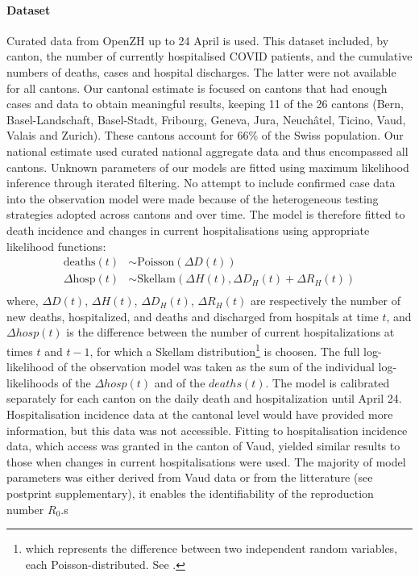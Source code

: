 \paragraph{Dataset} Curated data from OpenZH\cite[3\baselineskip]{openZH:OpenZHCovid19:2020} up to 24 April is used. This dataset included, by canton, the number of currently hospitalised COVID patients, and the cumulative numbers of deaths, cases and hospital discharges. The latter were not available for all cantons. Our cantonal estimate is focused on cantons that had enough cases and data to obtain meaningful results, keeping 11 of the 26 cantons (Bern, Basel-Landschaft, Basel-Stadt, Fribourg, Geneva, Jura, Neuchâtel, Ticino, Vaud, Valais and Zurich). These cantons account for 66\% of the Swiss population. Our national estimate used curated national aggregate data and thus encompassed all cantons\cite{Probst:DaenuprobstCovid19casesswitzerland:2020}. Unknown parameters of our models are fitted using maximum likelihood inference through iterated filtering\cite{Ionides:InferenceDynamicLatent:2015}. No attempt to include confirmed case data into the observation model were made because of the heterogeneous testing strategies adopted across cantons and over time. The model is therefore fitted to death incidence and changes in current hospitalisations using appropriate likelihood functions:
\begin{equation}
\begin{split}
 \text{deaths}(t) &\sim \text{Poisson}(\Delta D(t)) \\
\Delta  \text{hosp}(t) &\sim \text{Skellam}(\Delta H(t), \Delta D_H(t) + \Delta R_H(t)) \\
\end{split}
\end{equation}
\noindent where, $\Delta D(t)$, $\Delta H(t)$, $\Delta D_H(t)$, $\Delta R_H(t)$ are respectively the number of new deaths, hospitalized, and deaths and discharged from hospitals at time $t$, and $\Delta hosp(t)$ is the difference between the number of current hospitalizations at times $t$ and $t-1$, for which a Skellam distribution\footnote{which represents the difference between two independent random variables, each Poisson-distributed. See .} is choosen. The full log-likelihood of the observation model was taken as the sum of the individual log-likelihoods of the $\Delta hosp(t)$ and of the $deaths(t)$. 
The model is calibrated separately for each canton on the daily death and hospitalization until April 24. Hospitalisation incidence data at the cantonal level would have provided more information, but this data was not accessible. Fitting to hospitalisation incidence data, which access was granted in the canton of Vaud, yielded similar results to those when changes in current hospitalisations were used. The majority of model parameters was either derived from Vaud data or from the litterature (see postprint supplementary), it enables the identifiability of the reproduction number $R_0$.s 
 
